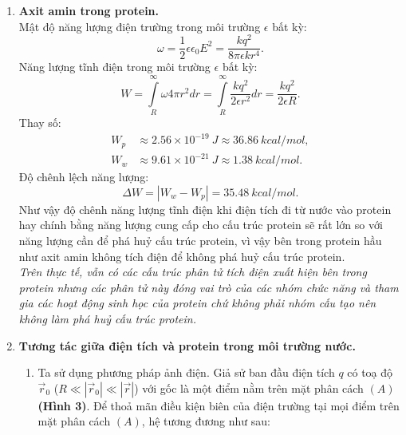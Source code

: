 \begin{enumerate}
    \item \textbf{Axit amin trong protein.} \\
    Mật độ năng lượng điện trường trong môi trường $\epsilon$ bất kỳ:
\begin{equation} \label{eq1_Protein}
    \omega = \dfrac{1}{2}\epsilon\epsilon_0E^2 = \dfrac{kq^2}{8\pi\epsilon k  r^4}.
\end{equation}
Năng lượng tĩnh điện trong môi trường $\epsilon$ bất kỳ:
\begin{equation} \label{eq2_Protein}
    W =\displaystyle\int\limits^{\infty}_{R}\omega 4\pi r^2dr=\displaystyle\int\limits^{\infty}_{R}\dfrac{kq^2}{2\epsilon r^2}dr  =\dfrac{kq^2}{2\epsilon R}.
\end{equation}
Thay số:
\begin{align} 
    \label{eq3_Protein}
    W_p&\approx 2.56 \times 10^{-19} \ \si{J} \approx 36.86 \ \si{kcal/mol},\\
    \label{eq4_Protein}
    W_w&\approx 9.61 \times 10^{-21} \ \si{J} \approx 1.38 \ \si{kcal/mol}.
\end{align}
Độ chênh lệch năng lượng:
\begin{equation} \label{eq5_Protein}
    \Delta W = |W_w - W_p| = 35.48 \ \si{kcal/mol}.
\end{equation}
Như vậy độ chênh năng lượng tĩnh điện khi điện tích đi từ nước vào protein hay chính bằng năng lượng cung cấp cho cấu trúc protein sẽ rất lớn so với năng lượng cần để phá huỷ cấu trúc protein, vì vậy bên trong protein hầu như axit amin không tích điện để không phá huỷ cấu trúc protein. \\
\textit{Trên thực tế, vẫn có các cấu trúc phân tử tích điện xuất hiện bên trong protein nhưng các phân tử này đóng vai trò của các nhóm chức năng và tham gia các hoạt động sinh học của protein chứ không phải nhóm cấu tạo nên không làm phá huỷ cấu trúc protein.}
     \item \textbf{Tương tác giữa điện tích và protein trong môi trường nước.}
     \begin{enumerate}[label=\textbf{\alph*,}]\itemsep0em
         \item Ta sử dụng phương pháp ảnh điện. Giả sử ban đầu điện tích $q$ có toạ độ $\Vec{r}_0$ ($R\ll|\Vec{r}_0| \ll |\Vec{r}|$) với gốc là một điểm nằm trên mặt phân cách $(A)$ \textbf{(Hình 3)}. Để thoả mãn điều kiện biên của điện trường tại mọi điểm trên mặt phân cách $(A)$, hệ tương đương như sau:
         \begin{enumerate}

\end{enumerate}
\end{enumerate}
\end{enumerate}
